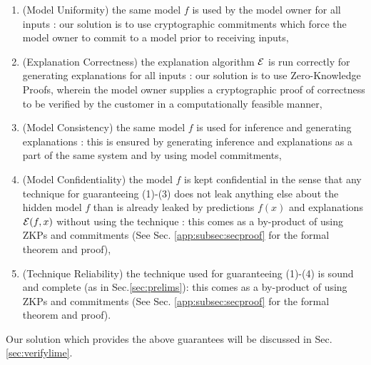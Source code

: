 \begin{enumerate}
    \item (Model Uniformity) the same model $f$ is used by the model owner for all inputs  : our solution is to use cryptographic commitments which force the model owner to commit to a model prior to receiving inputs,
    \item (Explanation Correctness) the explanation algorithm $\mathcal{E}$ is run correctly for generating explanations for all inputs : our solution is to use Zero-Knowledge Proofs, wherein the model owner supplies a cryptographic proof of correctness to be verified by the customer in a computationally feasible manner,
    \item (Model Consistency) the same model $f$ is used for inference and generating explanations : this is ensured by generating inference and explanations as a part of the same system and by using model commitments,
    \item (Model Confidentiality) the model $f$ is kept confidential in the sense that any technique for guaranteeing (1)-(3) does not leak anything else about the hidden model $f$ than is already leaked by predictions $f(x)$ and explanations $\mathcal{E}(f,x)$ without using the technique : this comes as a by-product of using ZKPs and commitments (See Sec. \ref{app:subsec:secproof} for the formal theorem and proof),
    \item (Technique Reliability) the technique used for guaranteeing (1)-(4) is sound and complete (as in Sec.\ref{sec:prelims}): this comes as a by-product of using ZKPs and commitments (See Sec. \ref{app:subsec:secproof} for the formal theorem and proof).
\end{enumerate}

Our solution \name which provides the above guarantees will be discussed in Sec. \ref{sec:verifylime}.